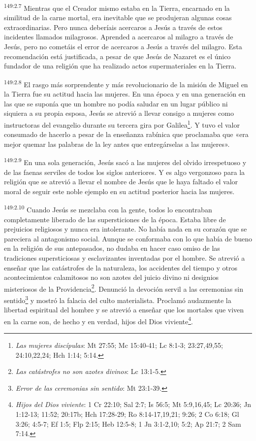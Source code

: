 \par
\textsuperscript{149:2.7} Mientras que el Creador mismo estaba en la Tierra, encarnado en la similitud de la carne mortal, era inevitable que se produjeran algunas cosas extraordinarias. Pero nunca deberíais acercaros a Jesús a través de estos incidentes llamados milagrosos. Aprended a acercaros al milagro a través de Jesús, pero no cometáis el error de acercaros a Jesús a través del milagro. Esta recomendación está justificada, a pesar de que Jesús de Nazaret es el único fundador de una religión que ha realizado actos supermateriales en la Tierra.

\par
\textsuperscript{149:2.8} El rasgo más sorprendente y más revolucionario de la misión de Miguel en la Tierra fue su actitud hacia las mujeres. En una época y en una generación en las que se suponía que un hombre no podía saludar en un lugar público ni siquiera a su propia esposa, Jesús se atrevió a llevar consigo a mujeres como instructoras del evangelio durante su tercera gira por Galilea\footnote{\textit{Las mujeres discípulas}: Mt 27:55; Mc 15:40-41; Lc 8:1-3; 23:27,49,55; 24:10,22,24; Hch 1:14; 5:14.}. Y tuvo el valor consumado de hacerlo a pesar de la enseñanza rabínica que proclamaba que «era mejor quemar las palabras de la ley antes que entregárselas a las mujeres».

\par
\textsuperscript{149:2.9} En una sola generación, Jesús sacó a las mujeres del olvido irrespetuoso y de las faenas serviles de todos los siglos anteriores. Y es algo vergonzoso para la religión que se atrevió a llevar el nombre de Jesús que le haya faltado el valor moral de seguir este noble ejemplo en su actitud posterior hacia las mujeres.

\par
\textsuperscript{149:2.10} Cuando Jesús se mezclaba con la gente, todos lo encontraban completamente liberado de las supersticiones de la época. Estaba libre de prejuicios religiosos y nunca era intolerante. No había nada en su corazón que se pareciera al antagonismo social. Aunque se conformaba con lo que había de bueno en la religión de sus antepasados, no dudaba en hacer caso omiso de las tradiciones supersticiosas y esclavizantes inventadas por el hombre. Se atrevió a enseñar que las catástrofes de la naturaleza, los accidentes del tiempo y otros acontecimientos calamitosos no son azotes del juicio divino ni designios misteriosos de la Providencia\footnote{\textit{Las catástrofes no son azotes divinos}: Lc 13:1-5.}. Denunció la devoción servil a las ceremonias sin sentido\footnote{\textit{Error de las ceremonias sin sentido}: Mt 23:1-39.} y mostró la falacia del culto materialista. Proclamó audazmente la libertad espiritual del hombre y se atrevió a enseñar que los mortales que viven en la carne son, de hecho y en verdad, hijos del Dios viviente\footnote{\textit{Hijos del Dios viviente}: 1 Cr 22:10; Sal 2:7; Is 56:5; Mt 5:9,16,45; Lc 20:36; Jn 1:12-13; 11:52; 20:17b; Hch 17:28-29; Ro 8:14-17,19,21; 9:26; 2 Co 6:18; Gl 3:26; 4:5-7; Ef 1:5; Flp 2:15; Heb 12:5-8; 1 Jn 3:1-2,10; 5:2; Ap 21:7; 2 Sam 7:14.}.


